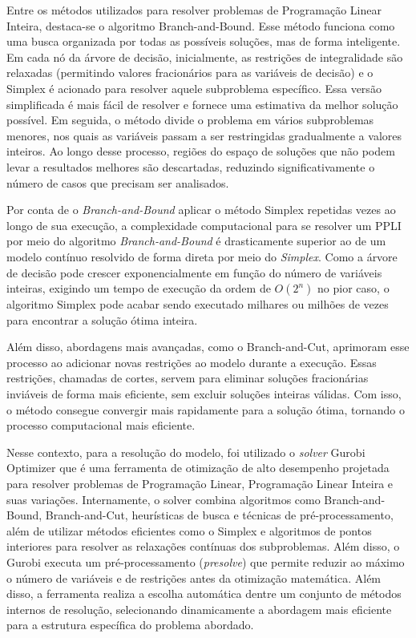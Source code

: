 Entre os métodos utilizados para resolver problemas de Programação Linear Inteira, destaca-se o algoritmo Branch-and-Bound. Esse método funciona como uma busca organizada por todas as possíveis soluções, mas de forma inteligente. Em cada nó da árvore de decisão, inicialmente, as restrições de integralidade são relaxadas (permitindo valores fracionários para as variáveis de decisão) e o Simplex é acionado para resolver aquele subproblema específico. Essa versão simplificada é mais fácil de resolver e fornece uma estimativa da melhor solução possível. Em seguida, o método divide o problema em vários subproblemas menores, nos quais as variáveis passam a ser restringidas gradualmente a valores inteiros. Ao longo desse processo, regiões do espaço de soluções que não podem levar a resultados melhores são descartadas, reduzindo significativamente o número de casos que precisam ser analisados.

Por conta de o \textit{Branch-and-Bound} aplicar o método Simplex repetidas vezes ao longo de sua execução, a complexidade computacional para se resolver um PPLI por meio do algoritmo \textit{Branch-and-Bound} é drasticamente superior ao de um modelo contínuo resolvido de forma direta por meio do \textit{Simplex}.
Como a árvore de decisão pode crescer exponencialmente em função do número de variáveis inteiras, exigindo um tempo de execução da ordem de $O(2^n)$ no pior caso, o algoritmo Simplex pode acabar sendo executado milhares ou milhões de vezes para encontrar a solução ótima inteira.

Além disso, abordagens mais avançadas, como o Branch-and-Cut, aprimoram esse processo ao adicionar novas restrições ao modelo durante a execução. Essas restrições, chamadas de cortes, servem para eliminar soluções fracionárias inviáveis de forma mais eficiente, sem excluir soluções inteiras válidas. Com isso, o método consegue convergir mais rapidamente para a solução ótima, tornando o processo computacional mais eficiente.

Nesse contexto, para a resolução do modelo, foi utilizado o \textit{solver} Gurobi Optimizer que é uma ferramenta de otimização de alto desempenho projetada para resolver problemas de Programação Linear, Programação Linear Inteira e suas variações. Internamente, o solver combina algoritmos como Branch-and-Bound, Branch-and-Cut, heurísticas de busca e técnicas de pré-processamento, além de utilizar métodos eficientes como o Simplex e algoritmos de pontos interiores para resolver as relaxações contínuas dos subproblemas. Além disso, o Gurobi executa um pré-processamento (\textit{presolve}) que permite reduzir ao máximo o número de variáveis e de restrições antes da otimização matemática. Além disso, a ferramenta realiza a escolha automática dentre um conjunto de métodos internos de resolução, selecionando dinamicamente a abordagem mais eficiente para a estrutura específica do problema abordado.

